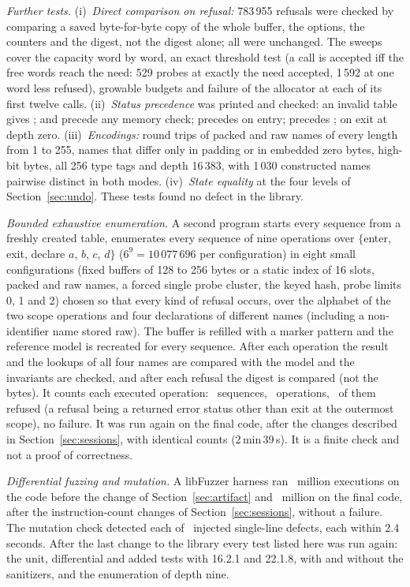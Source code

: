 \emph{Further tests.} (i)~\emph{Direct comparison on refusal:} 783\,955 refusals were checked by comparing a saved byte-for-byte copy of the whole buffer, the options, the counters and the digest, not the digest alone; all were unchanged. The sweeps cover the capacity word by word, an exact threshold test (a call is accepted iff the free words reach the need: 529 probes at exactly the need accepted, 1\,592 at one word less refused), growable budgets and failure of the allocator at each of its first twelve calls. (ii)~\emph{Status precedence} was printed and checked: an invalid table gives ;  and  precede any memory check;  precedes  on entry;  precedes ;  on exit at depth zero. (iii)~\emph{Encodings:} round trips of packed and raw names of every length from 1 to 255, names that differ only in padding or in embedded zero bytes, high-bit bytes, all 256 type tags and depth 16\,383, with 1\,030 constructed names pairwise distinct in both modes. (iv)~\emph{State equality} at the four levels of Section~\ref{sec:undo}. These tests found no defect in the library.

\emph{Bounded exhaustive enumeration.} A second program starts every sequence from a freshly created table, enumerates every sequence of nine operations over $\{$enter, exit, declare $a$, $b$, $c$, $d\}$ ($6^9=10\,077\,696$ per configuration) in eight small configurations (fixed buffers of 128 to 256 bytes or a static index of 16 slots, packed and raw names, a forced single probe cluster, the keyed hash, probe limits 0, 1 and 2) chosen so that every kind of refusal occurs, over the alphabet of the two scope operations and four declarations of different names (including a non-identifier name stored raw). The buffer is refilled with a marker pattern and the reference model is recreated for every sequence. After each operation the result and the lookups of all four names are compared with the model and the invariants are checked, and after each refusal the digest is compared (not the bytes). It counts each executed operation: \ExhSeq\ sequences, \ExhOps\ operations, \ExhRefusals\ of them refused (a refusal being a returned error status other than exit at the outermost scope), no failure. It was run again on the final code, after the changes described in Section~\ref{sec:sessions}, with identical counts (2\,min\,39\,s). It is a finite check and not a proof of correctness.

\emph{Differential fuzzing and mutation.} A libFuzzer harness ran \FuzzBefore\ million executions on the code before the change of Section~\ref{sec:artifact} and \FuzzFinal\ million on the final code, after the instruction-count changes of Section~\ref{sec:sessions}, without a failure. The mutation check detected each of \Mutants\ injected single-line defects, each within 2.4 seconds. After the last change to the library every test listed here was run again: the unit, differential and added tests with  16.2.1 and  22.1.8, with and without the sanitizers, and the enumeration of depth nine.

